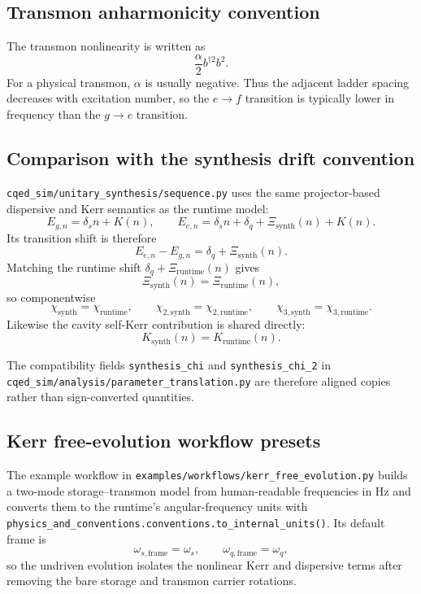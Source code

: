 \documentclass[11pt]{article}
\begin{document}
\subsection*{Transmon anharmonicity convention}
The transmon nonlinearity is written as
\[
\frac{\alpha}{2} b^{\dagger 2}b^2.
\]
For a physical transmon, \(\alpha\) is usually negative. Thus the adjacent ladder
spacing decreases with excitation number, so the \(e\rightarrow f\) transition
is typically lower in frequency than the \(g\rightarrow e\) transition.

\subsection*{Comparison with the synthesis drift convention}
\texttt{cqed\_sim/unitary\_synthesis/sequence.py} uses the same projector-based
dispersive and Kerr semantics as the runtime model:
\[
E_{g,n}
=
\delta_s n
+
K(n),
\qquad
E_{e,n}
=
\delta_s n
+
\delta_q
+
\Xi_{\mathrm{synth}}(n)
+
K(n).
\]
Its transition shift is therefore
\[
E_{e,n}-E_{g,n} = \delta_q + \Xi_{\mathrm{synth}}(n).
\]
Matching the runtime shift \(\delta_q+\Xi_{\mathrm{runtime}}(n)\) gives
\[
\Xi_{\mathrm{synth}}(n)=\Xi_{\mathrm{runtime}}(n),
\]
so componentwise
\[
\chi_{\mathrm{synth}}=\chi_{\mathrm{runtime}},\qquad
\chi_{2,\mathrm{synth}}=\chi_{2,\mathrm{runtime}},\qquad
\chi_{3,\mathrm{synth}}=\chi_{3,\mathrm{runtime}}.
\]
Likewise the cavity self-Kerr contribution is shared directly:
\[
K_{\mathrm{synth}}(n)=K_{\mathrm{runtime}}(n).
\]

\noindent
The compatibility fields \texttt{synthesis\_chi} and
\texttt{synthesis\_chi\_2} in
\texttt{cqed\_sim/analysis/parameter\_translation.py} are therefore aligned
copies rather than sign-converted quantities.

\subsection*{Kerr free-evolution workflow presets}
The example workflow in \texttt{examples/workflows/kerr\_free\_evolution.py}
builds a two-mode storage--transmon model from human-readable frequencies in Hz
and converts them to the runtime's angular-frequency units with
\texttt{physics\_and\_conventions.conventions.to\_internal\_units()}.
Its default frame is
\[
\omega_{s,\mathrm{frame}} = \omega_s,
\qquad
\omega_{q,\mathrm{frame}} = \omega_q,
\]
so the undriven evolution isolates the nonlinear Kerr and dispersive terms after
removing the bare storage and transmon carrier rotations.
\end{document}
